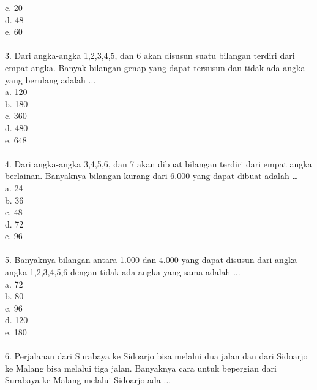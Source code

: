 \documentclass[11pt,fleqn]{book} %
\begin{document}
c.	20\\

d.	48\\

e.	60\\
\\

3. Dari angka-angka 1,2,3,4,5, dan 6 akan disusun suatu bilangan terdiri dari empat angka. Banyak bilangan genap yang dapat tersusun dan tidak ada angka yang berulang adalah ...\\ 

a.	120\\

b.	180\\

c.	360\\

d.	480\\

e.	648\\
\\

4. Dari angka-angka 3,4,5,6, dan 7 akan dibuat bilangan terdiri dari empat angka berlainan. Banyaknya bilangan kurang dari 6.000 yang dapat dibuat adalah …\\ 

a.	24\\

b.	36\\

c.	48\\

d.	72\\

e.	96\\
\\

5. Banyaknya bilangan antara 1.000 dan 4.000 yang dapat disusun dari angka-angka 1,2,3,4,5,6 dengan tidak ada angka yang sama adalah ...\\

a.	72\\

b.	80\\

c.	96\\

d.	120\\

e.	180\\
\\

6. Perjalanan dari Surabaya ke Sidoarjo bisa melalui dua jalan dan dari Sidoarjo ke Malang bisa melalui tiga jalan. Banyaknya cara untuk bepergian dari Surabaya ke Malang melalui Sidoarjo ada ...\\
\end{document}
